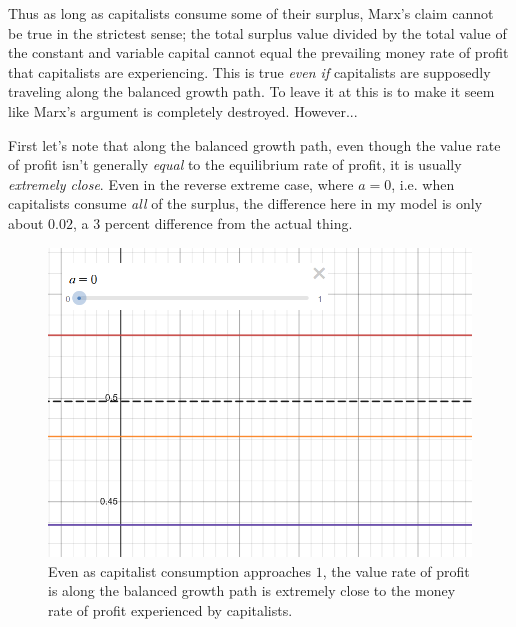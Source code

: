 \documentclass{article}
\theoremstyle{theorem}
\begin{document}
Thus as long as capitalists consume some of their surplus, Marx's claim cannot be true in the strictest sense; the total surplus value divided by the total value of the constant and variable capital cannot equal the prevailing money rate of profit that capitalists are experiencing. This is true \emph{even if} capitalists are supposedly traveling along the balanced growth path. To leave it at this is to make it seem like Marx's argument is completely destroyed. However... \par 
First let's note that along the balanced growth path, even though the value rate of profit isn't generally \emph{equal} to the equilibrium rate of profit, it is usually \emph{extremely close}. Even in the reverse extreme case, where $a=0$, i.e. when capitalists consume \emph{all} of the surplus, the difference here in my model is only about $0.02$, a $3$ percent difference from the actual thing.
\begin{figure}[H]
\centering
\includegraphics[scale=.7]{Images/reverseExtreme}
\caption{Even as capitalist consumption approaches $1$, the value rate of profit is along the balanced growth path is extremely close to the money rate of profit experienced by capitalists.}
\end{figure}
\end{document}
